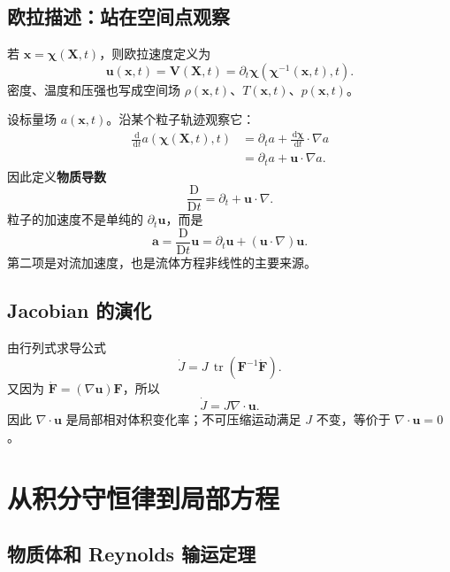 \documentclass[cn,hazy,blue,11pt,normal]{elegantnote}
\numberwithin{equation}{section}
\newcommand{\dd}{\,\mathrm d}
\newcommand{\Dt}{\frac{\mathrm D}{\mathrm Dt}}
\newcommand{\vct}[1]{\bm{#1}}
\newcommand{\ten}[1]{\bm{#1}}
\newcommand{\tr}{\operatorname{tr}}
\begin{document}
\subsection{欧拉描述：站在空间点观察}

若 $\vct{x}=\vct{\chi}(\vct{X},t)$，则欧拉速度定义为
\begin{equation}
  \vct{u}(\vct{x},t)=\vct{V}(\vct{X},t)
  =\partial_t\vct{\chi}(\vct{\chi}^{-1}(\vct{x},t),t).
\end{equation}
密度、温度和压强也写成空间场 $\rho(\vct{x},t)$、$T(\vct{x},t)$、$p(\vct{x},t)$。

设标量场 $a(\vct{x},t)$。沿某个粒子轨迹观察它：
\begin{align}
  \frac{\dd}{\dd t}a(\vct{\chi}(\vct{X},t),t)
  &=\partial_t a+\frac{\dd\vct{\chi}}{\dd t}\cdot\nabla a \\
  &=\partial_t a+\vct{u}\cdot\nabla a.
\end{align}
因此定义\textbf{物质导数}
\begin{equation}
  \boxed{\Dt=\partial_t+\vct{u}\cdot\nabla.}
\end{equation}
粒子的加速度不是单纯的 $\partial_t\vct{u}$，而是
\begin{equation}
  \boxed{\vct{a}=\Dt\vct{u}
  =\partial_t\vct{u}+(\vct{u}\cdot\nabla)\vct{u}.}
\end{equation}
第二项是对流加速度，也是流体方程非线性的主要来源。

\subsection{Jacobian 的演化}

由行列式求导公式
\begin{equation}
  \dot J=J\,\tr(\ten{F}^{-1}\dot{\ten{F}}).
\end{equation}
又因为 $\dot{\ten{F}}=(\nabla\vct{u})\ten{F}$，所以
\begin{equation}
  \boxed{\dot J=J\nabla\cdot\vct{u}.}
\end{equation}
因此 $\nabla\cdot\vct{u}$ 是局部相对体积变化率；不可压缩运动满足 $J$ 不变，等价于 $\nabla\cdot\vct{u}=0$。

\section{从积分守恒律到局部方程}

\subsection{物质体和 Reynolds 输运定理}
\end{document}
